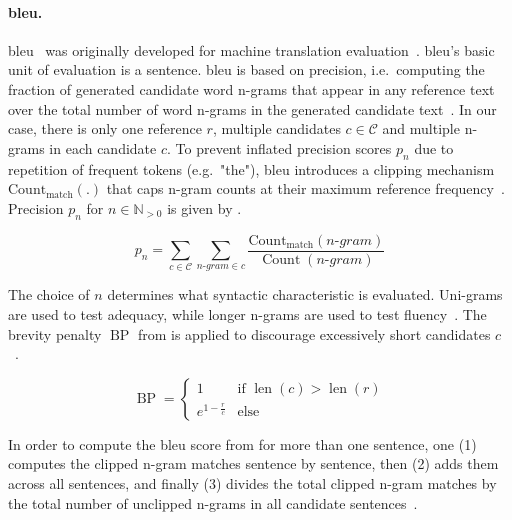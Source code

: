 \paragraph{\ac{bleu}.}
\ac{bleu}~\citep{papineni_bleu_2001} was originally developed for machine translation evaluation~\citep{zhou_paraphrase_2021,anantha_pearson_metrics_2021}. 
\ac{bleu}'s basic unit of evaluation is a sentence. 
\ac{bleu} is based on precision, i.e.\ computing the fraction of generated candidate word n-grams that appear in any reference text over the total number of word n-grams in the generated candidate text~\citep{kurt_pehlivanoglu_comparative_2024,palivela_optimization_2021,papineni_bleu_2001,anantha_pearson_metrics_2021}. 
In our case, there is only one reference $r$, multiple candidates $c \in \mathcal{C}$ and multiple n-grams in each candidate $c$.
To prevent inflated precision scores $p_n$ due to repetition of frequent tokens (e.g.\ "the"), \ac{bleu} introduces a clipping mechanism $\operatorname{Count_{match}}(.)$ that caps n-gram counts at their maximum reference frequency~\citep{papineni_bleu_2001}. 
Precision $p_n$ for $n \in \mathbb{N}_{>0}$ is given by .

\begin{equation}
    p_n = \sum_{c \in \mathcal{C}} \sum_{n\text{-}gram \in c} \frac{\operatorname{Count_{match}}(n\text{-}gram)}{\operatorname{Count}(n\text{-}gram)}
\label{eq:bleu}
\end{equation}

The choice of $n$ determines what syntactic characteristic is evaluated.
Uni-grams are used to test adequacy, while longer n-grams are used to test fluency~\citep{papineni_bleu_2001}. 
The brevity penalty $\operatorname{BP}$ from  is applied to discourage excessively short candidates $c$~\citep{papineni_bleu_2001}.

\begin{equation}
    \operatorname{BP} = \begin{cases}
        1 & \text{if } \operatorname{len}(c) > \operatorname{len}(r) \\
        e^{1 - \frac{r}{c}} & \text{else}
    \end{cases}
\label{eq:bleu_brevity_penalty}
\end{equation}

In order to compute the \ac{bleu} score from  for more than one sentence, 
one (1) computes the clipped n-gram matches sentence by sentence, 
then (2) adds them across all sentences, 
and finally (3) divides the total clipped n-gram matches by 
the total number of unclipped n-grams in all candidate sentences~\citep{papineni_bleu_2001,cordeiro_bleu_2007}.

